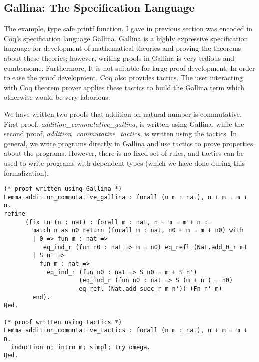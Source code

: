  \subsection{Gallina: The Specification Language}
 \label{sec:gallina}
  The example, type safe printf function, I gave in previous 
  section was encoded in Coq's specification language Gallina. 
  Gallina is a highly expressive specification 
  language for development of mathematical theories and proving the    
  theorems about these  theories; however, writing proofs in Gallina
  is very tedious and cumbersome. Furthermore, It is not suitable for large proof 
  development. In order to ease the proof development, Coq also provides 
  tactics.  The user interacting with Coq theorem prover applies these 
  tactics to build the  Gallina term  which otherwise would  
  be very laborious.
  
 We have written two proofs that addition on natural number is commutative. 
 First proof, \textit{addition\_commutative\_gallina}, is written using 
 Gallina, while the second proof, \textit{addition\_commutative\_tactics}, is written 
 using the tactics.  In general, we write programs directly in Gallina and use tactics 
 to prove properties about the programs. However, there is no fixed set of rules, and tactics 
 can be used to write programs with dependent types (which we have done during this
 formalization).
 
\begin{verbatim}
(* proof written using Gallina *)
Lemma addition_commutative_gallina : forall (n m : nat), n + m = m + n.
refine
      (fix Fn (n : nat) : forall m : nat, n + m = m + n :=
        match n as n0 return (forall m : nat, n0 + m = m + n0) with
        | 0 => fun m : nat => 
           eq_ind_r (fun n0 : nat => m = n0) eq_refl (Nat.add_0_r m)
        | S n' =>
          fun m : nat =>
            eq_ind_r (fun n0 : nat => S n0 = m + S n')
                     (eq_ind_r (fun n0 : nat => S (m + n') = n0) 
                     eq_refl (Nat.add_succ_r m n')) (Fn n' m)
        end).
Qed.

(* proof written using tactics *)
Lemma addition_commutative_tactics : forall (n m : nat), n + m = m + n.
  induction n; intro m; simpl; try omega.
Qed.
\end{verbatim}



